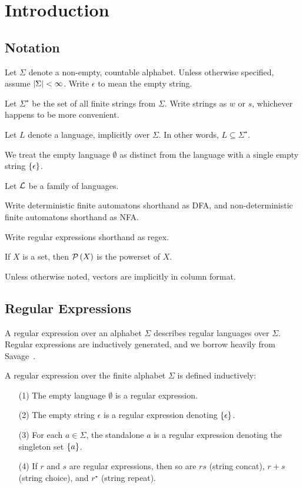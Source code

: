 \section{Introduction}

\subsection{Notation}

Let \(\Sigma\) denote a non-empty, countable alphabet.
Unless otherwise specified, assume \(\left\lvert\Sigma\right\rvert < \infty\).
Write \(\epsilon\) to mean the empty string.

Let \(\Sigma^\star\) be the set of all finite strings from \(\Sigma\).
Write strings as \(w\) or \(s\), whichever happens to be more convenient.

Let \(L\) denote a language, implicitly over \(\Sigma\).
In other words, \(L \subseteq \Sigma^\star\).

We treat the empty language \(\emptyset\) as distinct from
the language with a single empty string \(\left\{\epsilon\right\}\).

Let \(\mathcal{L}\) be a family of languages.

Write deterministic finite automatons shorthand as DFA,
and non-deterministic finite automatons shorthand as NFA.

Write regular expressions shorthand as regex.

If \(X\) is a set, then \(\mathcal{P}\left(X\right)\) is the powerset of \(X\).

Unless otherwise noted, vectors are implicitly in column format.


\subsection{Regular Expressions}
A regular expression over an alphabet \(\Sigma\) describes regular
languages over \(\Sigma\).
Regular expressions are inductively generated,
and we borrow heavily from Savage~\cite{savage1998models}.

\begin{definition}
  A regular expression over the finite alphabet \(\Sigma\)
  is defined inductively:
  \begin{enumerate}
    \item[(1)]
      The empty language \(\emptyset\) is a regular expression.

    \item[(2)]
      The empty string \(\epsilon\) is a regular expression denoting
      \(\left\{\epsilon\right\}\).

    \item[(3)]
      For each \(a \in \Sigma\),
      the standalone \(a\) is a regular expression
      denoting the singleton set \(\left\{a\right\}\).

    \item[(4)]
      If \(r\) and \(s\) are regular expressions, then so are
      \(rs\) (string concat), \(r + s\) (string choice),
      and \(r^\star\) (string repeat).
  \end{enumerate}
\end{definition}

